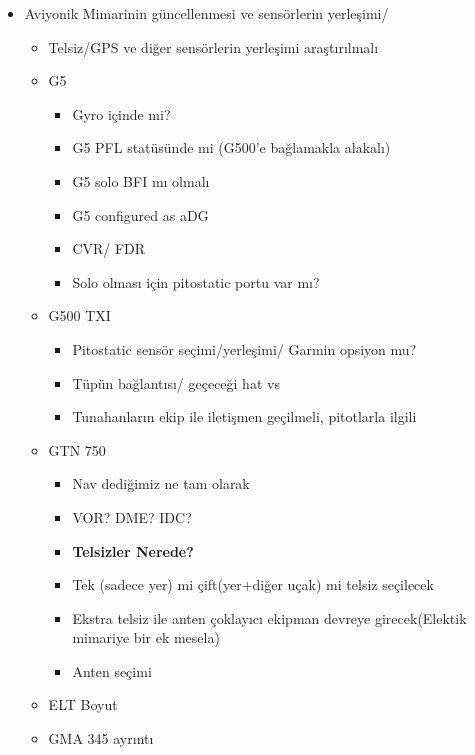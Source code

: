 \documentclass[a4paper,12pt]{article}
\begin{document}
\begin{itemize}
\begin{itemize}
			
		\end{itemize}
	
	
	\item Aviyonik Mimarinin güncellenmesi ve sensörlerin yerleşimi/
		
	
		\begin{itemize}
			\item Telsiz/GPS ve diğer sensörlerin yerleşimi araştırılmalı		
			\newpage
			\item G5
				\begin{itemize}
					\item Gyro içinde mi?
					\item G5 PFL statüsünde mi (G500'e bağlamakla alakalı)
					\item G5 solo BFI mı olmalı
					\item G5 configured as aDG
					\item CVR/ FDR
					\item Solo olması için pitostatic portu var mı?
				\end{itemize}
			
			\item G500 TXI
				\begin{itemize}
					\item Pitostatic sensör seçimi/yerleşimi/ Garmin opsiyon mu?
					\item Tüpün bağlantısı/ geçeceği hat vs
					\item Tunahanların ekip ile iletişmen geçilmeli, pitotlarla ilgili
					 
				\end{itemize}
			
			\item GTN 750
				\begin{itemize}
					\item Nav dediğimiz ne tam olarak
					\item VOR? DME? IDC?
					\item \textbf{Telsizler Nerede?}
					\item Tek (sadece yer) mi çift(yer+diğer uçak) mi telsiz seçilecek
					\item Ekstra telsiz ile anten çoklayıcı ekipman devreye girecek(Elektik mimariye bir ek mesela)
					\item Anten seçimi
				\end{itemize}
			\item ELT Boyut
			
			\item GMA 345 ayrıntı
			

\end{itemize}
\end{itemize}
\end{document}
